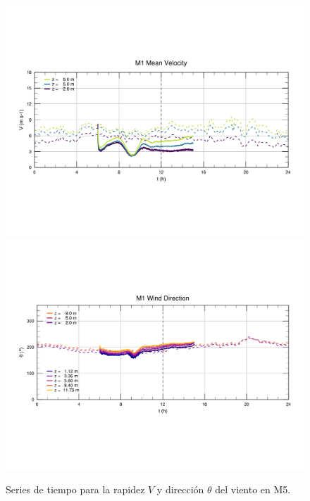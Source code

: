\begin{figure}[H]
	\centering
	\includegraphics[width=0.87\linewidth,page=5,trim={9mm 57mm 10mm 60mm},clip]{Imagenes/06/bol/ts_interpol_compare.pdf}\\%
	\includegraphics[width=0.87\linewidth,page=5,trim={12mm 52mm 10mm 60mm},clip]{Imagenes/06/bol/ts_interpol_compare_o.pdf}%
	\vspace{-2mm}\caption{Series de tiempo para la rapidez $V$ y dirección $\theta$ del viento en M5.}
	\label{fig:06_bol_ts_m5}
\end{figure}

